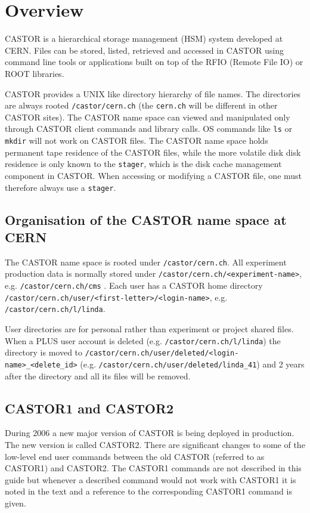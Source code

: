 \chapter{Overview}
CASTOR is a hierarchical storage management (HSM) system developed at CERN. Files can
be stored, listed, retrieved and accessed in CASTOR using command line tools or applications built
on top of the RFIO (Remote File IO) or ROOT libraries.

CASTOR provides a UNIX like directory hierarchy of file names. The directories are always
rooted {\tt /castor/cern.ch} (the {\tt cern.ch} will be different in other CASTOR sites).
The CASTOR name space can viewed and manipulated only through CASTOR client commands and library
calls. OS commands like {\tt ls} or {\tt mkdir} will not work on CASTOR files. The CASTOR
name space holds permanent tape residence of the CASTOR files, while the more volatile disk
disk residence is only known to the {\tt stager}, which is the disk cache management component
in CASTOR. When accessing or modifying a CASTOR file, one must therefore always use a
{\tt stager}.

\section{Organisation of the CASTOR name space at CERN}
The CASTOR name space is rooted under {\tt /castor/cern.ch}. All experiment production
data is normally stored under {\tt /castor/cern.ch/<experiment-name>}, e.g.
{\tt /castor/cern.ch/cms} . Each user has a CASTOR home directory
{\tt /castor/cern.ch/user/<first-letter>/<login-name>}, e.g. {\tt /castor/cern.ch/l/linda}.

User directories are for personal rather than experiment or project shared files. When a
PLUS user account is deleted (e.g. {\tt /castor/cern.ch/l/linda}) the directory is moved to
{\tt /castor/cern.ch/user/deleted/<login-name>\_<delete\_id>}
(e.g. {\tt /castor/cern.ch/user/deleted/linda\_41}) and 2 years after the directory and
all its files will be removed.

\section{CASTOR1 and CASTOR2}
During 2006 a new major version of CASTOR is being deployed in production. The new version
is called CASTOR2. There are significant changes to some of the low-level end user commands
between the old CASTOR (referred to as CASTOR1) and CASTOR2. The CASTOR1 commands are not
described in this guide but whenever a described command would not work with CASTOR1 it is
noted in the text and a reference to the corresponding CASTOR1 command is given.

